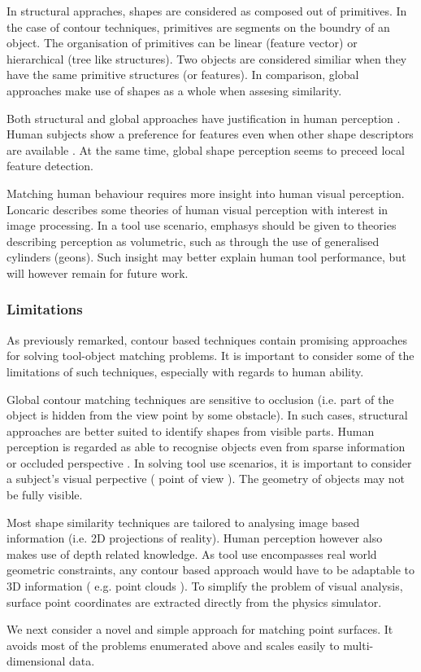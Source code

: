 \documentclass[11]{article}
\begin{document}
In structural appraches, shapes are considered as composed out of primitives. In the case of contour techniques, primitives are segments on the boundry of an object. The organisation of primitives can be linear (feature vector\cite{zhang2004}) or hierarchical (tree like structures\cite{zhu2015}). Two objects are considered similiar when they have the same primitive structures (or features). In comparison, global approaches make use of shapes as a whole when assesing similarity. 

Both structural and global approaches have justification in human perception \cite{zhang2004}. Human subjects show a preference for features even when other shape descriptors are available \cite{chatbri2016}. At the same time, global shape perception seems to preceed local feature detection\cite{navon1977}. 

Matching human behaviour requires more insight into human visual perception. Loncaric\cite{loncaric1998} describes some theories of human visual perception with interest in image processing. In a tool use scenario, emphasys should be given to theories describing perception as volumetric, such as through the use of generalised cylinders (geons\cite{dickinson2014}). Such insight may better explain human tool performance, but will however remain for future work.    

\subsubsection{Limitations}
As previously remarked, contour based techniques contain promising approaches for solving tool-object matching problems. It is important to consider some of the limitations of such techniques, especially with regards to human ability. 

Global contour matching techniques are sensitive to occlusion (i.e. part of the object is hidden from the view point by some obstacle). In such cases, structural approaches are better suited to identify shapes from visible parts. Human perception is regarded as able to recognise objects even from sparse information or occluded perspective \cite{loncaric1998}. In solving tool use scenarios, it is important to consider a subject's visual perpective ( point of view ). The geometry of objects may not be fully visible. 

Most shape similarity techniques are tailored to analysing image based information (i.e. 2D projections of reality). Human perception however also makes use of depth related knowledge. As tool use encompasses real world geometric constraints, any contour based approach would have to be adaptable to 3D information ( e.g. point clouds ). To simplify the problem of visual analysis, surface point coordinates are extracted directly from the physics simulator. 

We next consider a novel and simple approach for matching point surfaces. It avoids most of the problems enumerated above and scales easily to multi-dimensional data.  


\printbibliography
\end{document}
